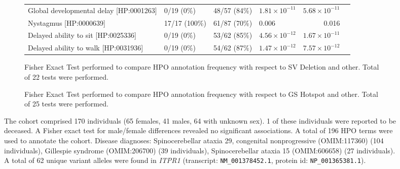 \begin{figure}[htbp]
\begin{subfigure}[b]{0.95\textwidth}
{\begin{tabular}{llllrr}
Global developmental delay [HP:0001263] & 0/19 (0\%) & 48/57 (84\%) & $1.81\times 10^{-11}$ & $5.68\times 10^{-11}$\\
Nystagmus [HP:0000639] & 17/17 (100\%) & 61/87 (70\%) & 0.006 & 0.016\\
Delayed ability to sit [HP:0025336] & 0/19 (0\%) & 53/62 (85\%) & $4.56\times 10^{-12}$ & $1.67\times 10^{-11}$\\
Delayed ability to walk [HP:0031936] & 0/19 (0\%) & 54/62 (87\%) & $1.47\times 10^{-12}$ & $7.57\times 10^{-12}$\\
\bottomrule
\end{tabular}
}
\captionsetup{justification=raggedright,singlelinecheck=false}
\caption{Fisher Exact Test performed to compare HPO annotation frequency with respect to SV Deletion and other. Total of
        22 tests were performed.}
\end{subfigure}
\vspace{0.2em}
\begin{subfigure}[b]{0.95\textwidth}
\centering
{}
\captionsetup{justification=raggedright,singlelinecheck=false}
\caption{Fisher Exact Test performed to compare HPO annotation frequency with respect to GS Hotspot and other. Total of
        25 tests were performed. }
\end{subfigure}

\vspace{0.2em}

\caption{The cohort comprised 170 individuals (65 females, 41 males, 64 with unknown sex). 1 of these individuals were reported to be deceased. 
A Fisher exact test for male/female differences revealed no significant associations.
A total of 196 HPO terms were used to annotate the cohort. Disease diagnoses: Spinocerebellar ataxia 29, congenital nonprogressive (OMIM:117360) (104 individuals), Gillespie syndrome (OMIM:206700) (39 individuals), Spinocerebellar ataxia 15 (OMIM:606658) (27 individuals). A total of 62 unique variant alleles were found in \textit{ITPR1} (transcript: \texttt{NM\_001378452.1}, protein id: \texttt{NP\_001365381.1}).}
\end{figure}
